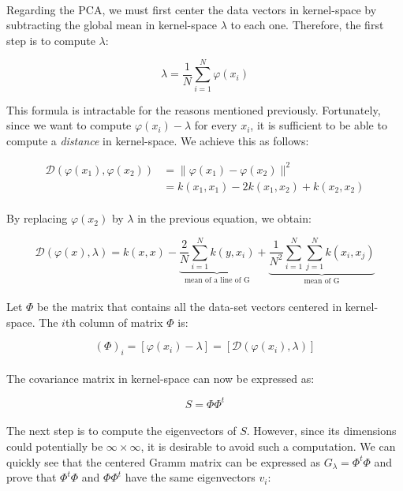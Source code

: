 \paragraph{}
Regarding the PCA, we must first center the data vectors in kernel-space by subtracting the global mean in kernel-space $\lambda$ to each one.
Therefore, the first step is to compute $\lambda$:

$$\lambda = \frac{1}{N}\sum_{i = 1}^{N} \varphi(x_i)$$

This formula is intractable for the reasons mentioned previously. Fortunately, since we want to
compute $\varphi(x_i) - \lambda$ for every $x_i$, it is sufficient to be able to compute a
\emph{distance} in kernel-space. We achieve this as follows:

\begin{align*}
\mathcal{D}(\varphi(x_1), \varphi(x_2)) &= \|\varphi(x_1) - \varphi(x_2)\|^2 \\
&= k(x_1, x_1) - 2k(x_1, x_2) +
k(x_2, x_2)
\end{align*}


\paragraph{}
By replacing $\varphi(x_2)$ by $\lambda$ in the previous equation, we obtain:

$$\mathcal{D}(\varphi(x), \lambda) = k(x, x) - \underbrace{\frac{2}{N}\sum_{i = 1}^N k(y,
x_i)}_{\text{mean of a line of G}} + \underbrace{\frac{1}{N^2}\sum_{i = 1}^{N}\sum_{j = 1}^{N} k(x_i, x_j)}_{\text{mean
of G}}$$

\paragraph{}
Let $\Phi$ be the matrix that contains all the data-set vectors centered in
kernel-space. The $i$th column of matrix $\Phi$ is:

$$(\Phi)_i = [\varphi(x_i) - \lambda] = [\mathcal{D}(\varphi(x_i), \lambda)]$$

\paragraph{} The covariance matrix in kernel-space can now be expressed as:

$$S = \Phi\Phi^t$$

\paragraph{} The next step is to compute the eigenvectors of $S$. However, since its dimensions could
potentially be
$\infty \times \infty$, it is desirable to avoid such a computation. We can quickly see that the centered Gramm
matrix can be expressed as $G_\lambda = \Phi^t\Phi$ and prove that $\Phi^t\Phi$ and $\Phi\Phi^t$ have the same
eigenvectors $v_i$:

